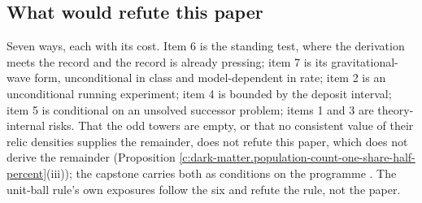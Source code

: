 \documentclass[11pt]{article}
\theoremstyle{definition}
\theoremstyle{plain}
\begin{document}
\subsection*{What would refute this paper}
\label{c:note.dark-matter.setting-what-would-refute-paper}
Seven ways, each with its cost. Item 6 is the standing test, where the derivation meets the record and the record is already pressing; item 7 is its gravitational-wave form, unconditional in class and model-dependent in rate; item 2 is an unconditional running experiment; item 4 is bounded by the deposit interval; item 5 is conditional on an unsolved successor problem; items 1 and 3 are theory-internal risks. That the odd towers are empty, or that no consistent value of their relic densities supplies the remainder, does not refute this paper, which does not derive the remainder (Proposition \ref{c:dark-matter.population-count-one-share-half-percent}(iii)); the capstone carries both as conditions on the programme \cite{ButlerT17}. The unit-ball rule's own exposures follow the six and refute the rule, not the paper.
\end{document}
